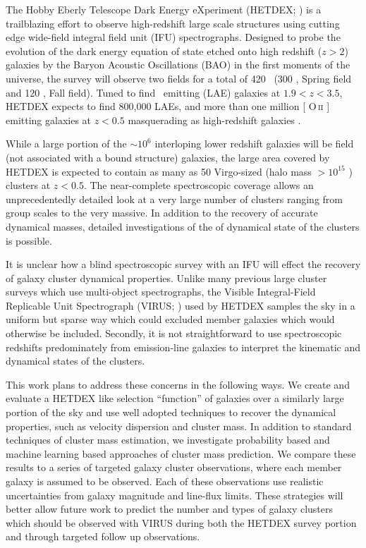 \documentclass[fleqn,usenatbib]{mnras}
\makeatletter
\DeclareRobustCommand{\ion}[2]{%
\relax\ifmmode
\ifx\testbx\f@series
{\mathbf{#1\,\mathsc{#2}}}\else
{\mathrm{#1\,\mathsc{#2}}}\fi
\else\textup{#1\,{\mdseries\textsc{#2}}}%
\fi}
\makeatother
\begin{document}
The Hobby Eberly Telescope Dark Energy eXperiment (HETDEX; \citealt{Hill2008}) is a trailblazing effort to observe high-redshift large scale structures using cutting edge wide-field integral field unit (IFU) spectrographs. Designed to probe the evolution of the dark energy equation of state etched onto high redshift ($z>2$) galaxies by the Baryon Acoustic Oscillations (BAO) \citep{Eisenstein2005} in the first moments of the universe, the survey will observe two fields for a total of 420 \degsq\ (300 \degsq, Spring field and 120 \degsq, Fall field). Tuned to find \lya\ emitting (LAE) galaxies at $1.9<z<3.5$, HETDEX expects to find 800,000 LAEs, and more than one million [\ion{O}{ii}] emitting galaxies at $z<0.5$ masquerading as high-redshift galaxies \citep{Acquaviva2014}. 

While a large portion of the $\sim10^6$ interloping lower redshift galaxies will be field (not associated with a bound structure) galaxies, the large area covered by HETDEX is expected to contain as many as 50 Virgo-sized (halo mass $>10^{15}$ \msol) clusters at $z<0.5$. The near-complete spectroscopic coverage allows an unprecedentedly detailed look at a very large number of clusters ranging from group scales to the very massive. In addition to the recovery of accurate dynamical masses, detailed investigations of the of dynamical state of the clusters is possible. 

It is unclear how a blind spectroscopic survey with an IFU will effect the recovery of galaxy cluster dynamical properties. Unlike many previous large cluster surveys  which use multi-object spectrographs, the Visible Integral-Field Replicable Unit Spectrograph (VIRUS; \citealt{Hill2012}) used by HETDEX samples the sky in a uniform but sparse way which could excluded member galaxies which would otherwise be included. Secondly, it is not straightforward to use spectroscopic redshifts predominately from emission-line galaxies to interpret the kinematic and dynamical states of the clusters.

This work plans to address these concerns in the following ways. We create and evaluate a HETDEX like selection ``function'' of galaxies over a similarly large portion of the sky and use well adopted techniques to recover the dynamical properties, such as velocity dispersion and cluster mass. In addition to standard techniques of cluster mass estimation, we investigate probability based and machine learning based approaches of cluster mass prediction. We compare these results to a series of targeted galaxy cluster observations, where each member galaxy is assumed to be observed. Each of these observations use realistic uncertainties from galaxy magnitude and line-flux limits. These strategies will better allow future work to predict the number and types of galaxy clusters which should be observed with VIRUS during both the HETDEX survey portion and through targeted follow up observations.
\end{document}
